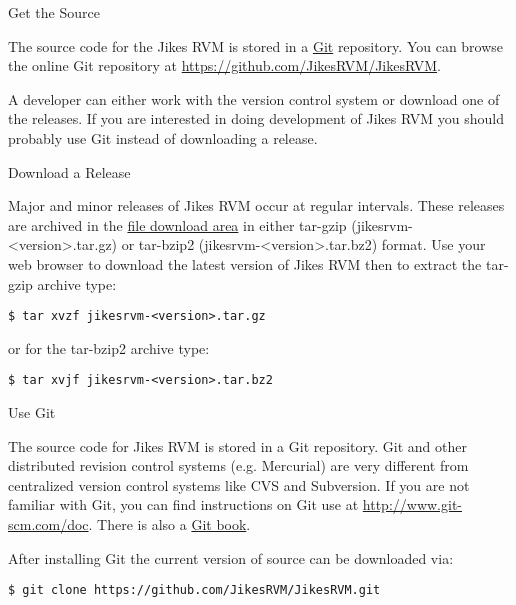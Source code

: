 \begin{chapter}{Get the Source}
\label{cha:getthesource}

The source code for the Jikes RVM is stored in a \href{http://www.git-scm.com/}{Git} repository. You can browse the online Git repository at \url{https://github.com/JikesRVM/JikesRVM}.

A developer can either work with the version control system or download one of the releases. If you are interested in doing development of Jikes RVM you should probably use Git instead of downloading a release.

\begin{section}{Download a Release}

Major and minor releases of Jikes RVM occur at regular intervals. These releases are archived in the \href{http://sourceforge.net/projects/jikesrvm/files/}{file download area} in either tar-gzip (jikesrvm-<version>.tar.gz) or tar-bzip2 (jikesrvm-<version>.tar.bz2) format. Use your web browser to download the latest version of Jikes RVM then to extract the tar-gzip archive type:

\begin{lstlisting}
$ tar xvzf jikesrvm-<version>.tar.gz
\end{lstlisting}

or for the tar-bzip2 archive type:

\begin{lstlisting}
$ tar xvjf jikesrvm-<version>.tar.bz2
\end{lstlisting}

\end{section}

\begin{section}{Use Git}

The source code for Jikes RVM is stored in a Git repository. Git and other distributed revision control systems (e.g. Mercurial) are very different from centralized version control systems like CVS and Subversion. If you are not familiar with Git, you can find instructions on Git use at \url{http://www.git-scm.com/doc}. There is also a \href{http://www.git-scm.com/book/en/v2}{Git book}.

After installing Git the current version of source can be downloaded via:

\begin{lstlisting}
$ git clone https://github.com/JikesRVM/JikesRVM.git
\end{lstlisting}


\end{section}
\end{chapter}
